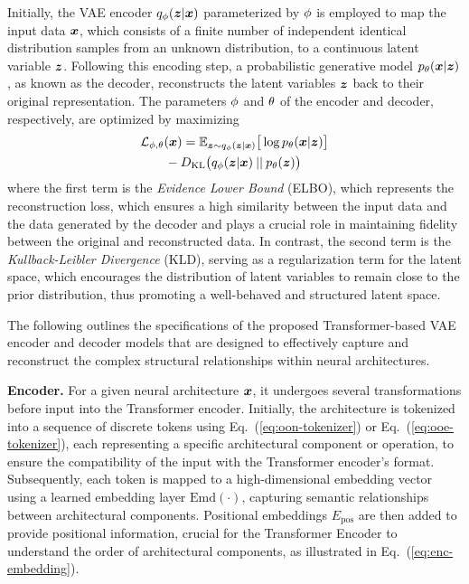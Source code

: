 \documentclass[../main.tex]{subfiles}
\begin{document}
Initially, the VAE encoder \( q_{\phi}(\bm{z}|\bm{x}) \) parameterized by \( \phi \) is employed to map the input data \( \bm{x} \), which consists of a finite number of independent identical distribution samples from an unknown distribution, to a continuous latent variable \( \bm{z} \).
Following this encoding step, a probabilistic generative model \( p_{\theta}(\bm{x}|\bm{z}) \), as known as the decoder, reconstructs the latent variables \( \bm{z} \) back to their original representation.
The parameters \( \phi \) and \( \theta \) of the encoder and decoder, respectively, are optimized by maximizing
\begin{multline}\label{eq:vae-loss}
  \mathcal{L}_{\encParam,\decParam}{(\archOri)} = \mathbb{E}_{\archLtn \sim \encDist_{\encParam}(\archLtn|\archOri)}{\big[\log{\decDist_\decParam(\archOri|\archLtn)}\big]} \\
  {-}\: D_\mathrm{KL}\big(\encDist_\encParam(\archLtn|\archOri)\:||\:\decDist_\decParam(\archLtn)\big)
\end{multline}
where the first term is the \textit{Evidence Lower Bound} (ELBO), which represents the reconstruction loss, which ensures a high similarity between the input data and the data generated by the decoder and plays a crucial role in maintaining fidelity between the original and reconstructed data.
In contrast, the second term is the \textit{Kullback-Leibler Divergence} (KLD), serving as a regularization term for the latent space, which encourages the distribution of latent variables to remain close to the prior distribution, thus promoting a well-behaved and structured latent space.

The following outlines the specifications of the proposed Transformer-based VAE encoder and decoder models that are designed to effectively capture and reconstruct the complex structural relationships within neural architectures.

\textbf{Encoder.}\quad
For a given neural architecture \( \bm{x} \), it undergoes several transformations before input into the Transformer encoder.
Initially, the architecture is tokenized into a sequence of discrete tokens using Eq.~(\ref{eq:oon-tokenizer}) or Eq.~(\ref{eq:ooe-tokenizer}), each representing a specific architectural component or operation, to ensure the compatibility of the input with the Transformer encoder's format.
Subsequently, each token is mapped to a high-dimensional embedding vector using a learned embedding layer \( \mathrm{Emd}(\cdot) \), capturing semantic relationships between architectural components.
Positional embeddings \( E_\mathrm{pos} \) are then added to provide positional information, crucial for the Transformer Encoder to understand the order of architectural components, as illustrated in Eq.~(\ref{eq:enc-embedding}).
\end{document}
